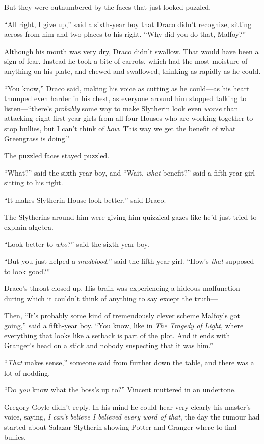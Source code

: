 But they were outnumbered by the faces that just looked puzzled.

“All right, I give up,” said a sixth-year boy that Draco didn’t recognize, sitting across from him and two places to his right. “Why did you do that, Malfoy?”

Although his mouth was very dry, Draco didn’t swallow. That would have been a sign of fear. Instead he took a bite of carrots, which had the most moisture of anything on his plate, and chewed and swallowed, thinking as rapidly as he could.

“You know,” Draco said, making his voice as cutting as he could—as his heart thumped even harder in his chest, as everyone around him stopped talking to listen—“there’s \emph{probably} some way to make Slytherin look even \emph{worse} than attacking eight first-year girls from all four Houses who are working together to stop bullies, but I can’t think of \emph{how}. This way we get the benefit of what Greengrass is doing.”

The puzzled faces stayed puzzled.

“What?” said the sixth-year boy, and “Wait, \emph{what} benefit?” said a fifth-year girl sitting to his right.

“It makes Slytherin House look better,” said Draco.

The Slytherins around him were giving him quizzical gazes like he’d just tried to explain algebra.

“Look better to \emph{who}?” said the sixth-year boy.

“But you just helped a \emph{mudblood},” said the fifth-year girl. “How’s \emph{that} supposed to look good?”

Draco’s throat closed up. His brain was experiencing a hideous malfunction during which it couldn’t think of anything to say except the truth—

Then, “It’s probably some kind of tremendously clever scheme Malfoy’s got going,” said a fifth-year boy. “You know, like in \emph{The Tragedy of Light}, where everything that looks like a setback is part of the plot. And it ends with Granger’s head on a stick and nobody suspecting that it was him.”

“\emph{That} makes sense,” someone said from further down the table, and there was a lot of nodding.

\later

“Do \emph{you} know what the boss’s up to?” Vincent muttered in an undertone.

Gregory Goyle didn’t reply. In his mind he could hear very clearly his master’s voice, saying, \emph{I can’t believe I believed every word of that}, the day the rumour had started about Salazar Slytherin showing Potter and Granger where to find bullies.


